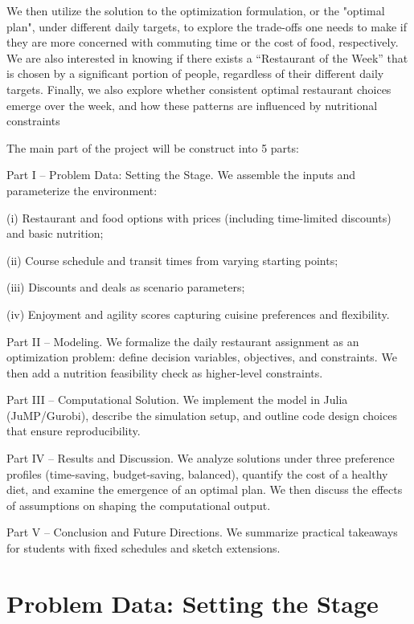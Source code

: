 \documentclass{article}
\begin{document}
We then utilize the solution to the optimization formulation, or the "optimal plan", under different daily targets, to explore the trade-offs one needs to make if they are more concerned with commuting time or the cost of food, respectively. We are also interested in knowing if there exists a ``Restaurant of the Week'' that is chosen by a significant portion of people, regardless of their different daily targets. Finally, we also explore whether consistent optimal restaurant choices emerge over the week, and how these patterns are influenced by nutritional constraints

The main part of the project will be construct into 5 parts:

Part I – Problem Data: Setting the Stage. We assemble the inputs and parameterize the environment:

(i) Restaurant and food options with prices (including time-limited discounts) and basic nutrition;

(ii) Course schedule and transit times from varying starting points;

(iii) Discounts and deals as scenario parameters;

(iv) Enjoyment and agility scores capturing cuisine preferences and flexibility.

Part II – Modeling. We formalize the daily restaurant assignment as an optimization problem: define decision variables, objectives, and constraints. We then add a nutrition feasibility check as higher-level constraints.

Part III – Computational Solution. We implement the model in Julia (JuMP/Gurobi), describe the simulation setup, and outline code design choices that ensure reproducibility.

Part IV – Results and Discussion. We analyze solutions under three preference profiles (time-saving, budget-saving, balanced), quantify the cost of a healthy diet, and examine the emergence of an optimal plan. We then discuss the effects of assumptions on shaping the computational output.

Part V – Conclusion and Future Directions. We summarize practical takeaways for students with fixed schedules and sketch extensions. 



\section{Problem Data: Setting the Stage}
\end{document}

